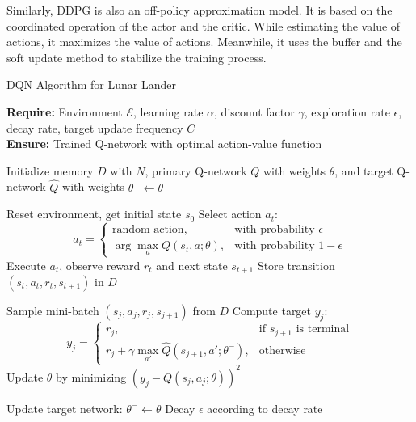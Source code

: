 \documentclass[conference]{IEEEtran}
\begin{document}
Similarly, DDPG is also an off-policy approximation model. It is based on the coordinated operation of the actor and the critic. While estimating the value of actions, it maximizes the value of actions. Meanwhile, it uses the buffer and the soft update method to stabilize the training process.
\begin{algorithm}
\caption{DQN Algorithm for Lunar Lander}
\textbf{Require:} Environment $\mathcal{E}$, learning rate $\alpha$, discount factor $\gamma$, exploration rate $\epsilon$, decay rate, target update frequency $C$ \\
\textbf{Ensure:} Trained Q-network with optimal action-value function

\begin{algorithmic}[0]
\State Initialize memory $D$ with $N$, primary Q-network $Q$ with weights $\theta$, and target Q-network $\hat{Q}$ with weights $\theta^{-}\leftarrow\theta$

    \State Reset environment, get initial state $s_0$
        \State Select action $a_t$:
        \[
        a_t = 
        \begin{cases} 
            \text{random action,} & \text{with probability } \epsilon \\ 
            \arg\max_a Q(s_t, a; \theta), & \text{with probability } 1 - \epsilon 
        \end{cases}
        \]
        \State Execute $a_t$, observe reward $r_t$ and next state $s_{t+1}$
        \State Store transition $(s_t, a_t, r_t, s_{t+1})$ in $D$
        

            \State Sample mini-batch $(s_j, a_j, r_j, s_{j+1})$ from $D$
            \State Compute target $y_j$:
            \[
            y_j = 
            \begin{cases} 
                r_j, & \text{if } s_{j+1} \text{ is terminal} \\ 
                r_j + \gamma \max_{a'} \hat{Q}(s_{j+1}, a'; \theta^{-}), & \text{otherwise} 
            \end{cases}
            \]
            \State Update $\theta$ by minimizing $\left( y_j - Q(s_j, a_j; \theta) \right)^2$
        \EndIf
        
            \State Update target network: $\theta^{-} \leftarrow \theta$
        \EndIf
    \EndWhile
    \State Decay $\epsilon$ according to decay rate

\EndFor

\end{algorithmic}
\end{algorithm}
\end{document}
